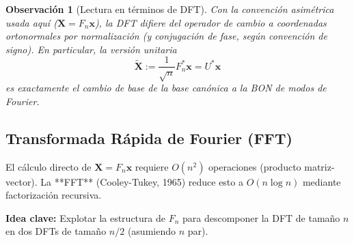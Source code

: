 \documentclass[a4paper,11pt]{report}
\newtheorem{remark}[theorem]{Observación}
\begin{document}
\begin{remark}[Lectura en términos de DFT]
Con la convención asimétrica usada aquí ($\mathbf{X}=F_n\mathbf{x}$), la DFT difiere del operador de cambio a coordenadas ortonormales por normalización (y conjugación de fase, según convención de signo). En particular, la versión unitaria
\[
\widetilde{\mathbf{X}} := \frac{1}{\sqrt{n}}F_n^*\mathbf{x}=U^*\mathbf{x}
\]
es exactamente el cambio de base de la base canónica a la BON de modos de Fourier.
\end{remark}

\subsection{Transformada Rápida de Fourier (FFT)}

El cálculo directo de $\mathbf{X} = F_n \mathbf{x}$ requiere $O(n^2)$ operaciones (producto matriz-vector). La **FFT** (Cooley-Tukey, 1965) reduce esto a $O(n \log n)$ mediante factorización recursiva.

\textbf{Idea clave:} Explotar la estructura de $F_n$ para descomponer la DFT de tamaño $n$ en dos DFTs de tamaño $n/2$ (asumiendo $n$ par).
\end{document}
